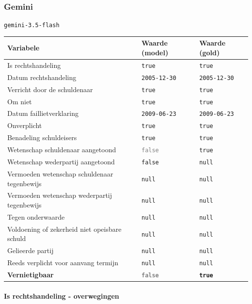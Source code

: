 \documentclass[
  dutch,
  a4paper,
]{article}
\begin{document}
\newpage


\subsubsection{Gemini}\label{gemini-2}

\texttt{gemini-3.5-flash}

\begin{center}
\small
\begin{tabular}{@{}p{7.4cm}p{2.6cm}p{2.6cm}@{}}
\toprule
Variabele & Waarde (model) & Waarde (gold) \\
\midrule
Is rechtshandeling & \texttt{true} & \texttt{true} \\
Datum rechtshandeling & \texttt{2005-12-30} & \texttt{2005-12-30} \\
Verricht door de schuldenaar & \texttt{true} & \texttt{true} \\
Om niet & \texttt{true} & \texttt{true} \\
Datum faillietverklaring & \texttt{2009-06-23} & \texttt{2009-06-23} \\
Onverplicht & \texttt{true} & \texttt{true} \\
Benadeling schuldeisers & \texttt{true} & \texttt{true} \\
Wetenschap schuldenaar aangetoond & \textcolor{gray}{\texttt{false}} & \texttt{true} \\
Wetenschap wederpartij aangetoond & \texttt{false} & \texttt{null} \\
Vermoeden wetenschap schuldenaar tegenbewijs & \texttt{null} & \texttt{null} \\
Vermoeden wetenschap wederpartij tegenbewijs & \texttt{null} & \texttt{null} \\
Tegen onderwaarde & \texttt{null} & \texttt{null} \\
Voldoening of zekerheid niet opeisbare schuld & \texttt{null} & \texttt{null} \\
Gelieerde partij & \texttt{null} & \texttt{null} \\
Reeds verplicht voor aanvang termijn & \texttt{null} & \texttt{null} \\
\textbf{Vernietigbaar} & \textbf{\textcolor{gray}{\texttt{false}}} & \textbf{\texttt{true}} \\
\bottomrule
\end{tabular}
\end{center}

\paragraph{Is rechtshandeling - overwegingen}\label{is-rechtshandeling---overwegingen-8}
\end{document}
